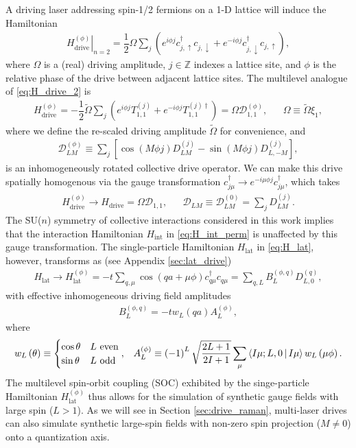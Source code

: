 \documentclass[nofootinbib,notitlepage,11pt]{revtex4-2}
\renewcommand{\t}{\text} %
\newcommand{\f}[2]{\dfrac{#1}{#2}} %
\newcommand{\p}[1]{\left(#1\right)} %
\renewcommand{\sp}[1]{\left[#1\right]} %
\newcommand{\bk}{\Braket} %
\newcommand{\1}{\mathds{1}}
\newcommand{\up}{\uparrow}
\newcommand{\dn}{\downarrow}
\newcommand{\D}{\mathcal{D}}
\begin{document}
A driving laser addressing spin-1/2 fermions on a 1-D lattice will
induce the Hamiltonian
\begin{align}
  \left. H_{\t{drive}}^{(\phi)} \right|_{n=2}
  = \f12 \Omega \sum_j
  \p{e^{i\phi j} c_{j,\up}^\dag c_{j,\dn}
    + e^{-i\phi j} c_{j,\dn}^\dag c_{j,\up}},
  \label{eq:H_drive_2}
\end{align}
where $\Omega$ is a (real) driving amplitude, $j\in\mathbb{Z}$ indexes
a lattice site, and $\phi$ is the relative phase of the drive between
adjacent lattice sites.  The multilevel analogue of
\eqref{eq:H_drive_2} is
\begin{align}
  H_{\t{drive}}^{(\phi)}
  = -\f12 \tilde\Omega \sum_j \p{e^{i\phi j} T_{1,1}^{(j)}
    + e^{-i\phi j} T_{1,1}^{(j)\dag}}
  = \Omega \D_{1,1}^{(\phi)},
  &&
  \Omega \equiv \tilde \Omega \xi_1,
  \label{eq:H_drive}
\end{align}
where we define the re-scaled driving amplitude $\tilde\Omega$ for
convenience, and
\begin{align}
  \D_{LM}^{(\phi)}
  \equiv \sum_j \sp{\cos\p{M\phi j} D_{LM}^{(j)}
    - \sin\p{M\phi j} D_{L,-M}^{(j)}},
  \label{eq:drive_rot}
\end{align}
is an inhomogeneously rotated collective drive operator.  We can make
this drive spatially homogenous via the gauge transformation
$c_{j\mu}^\dag \to e^{-i\mu\phi j} c_{j\mu}^\dag$, which takes
 \begin{align}
   H_{\t{drive}}^{(\phi)} \to H_{\t{drive}} = \Omega \D_{1,1},
   &&
   \D_{LM} \equiv \D_{LM}^{(0)} = \sum_j D_{LM}^{(j)}.
\end{align}
The SU($n$) symmetry of collective interactions considered in this
work implies that the interaction Hamiltonian $H_{\t{int}}$ in
\eqref{eq:H_int_perm} is unaffected by this gauge transformation.  The
single-particle Hamiltonian $H_{\t{lat}}$ in \eqref{eq:H_lat},
however, transforms as (see Appendix \ref{sec:lat_drive})
\begin{align}
  H_{\t{lat}}
  \to H_{\t{lat}}^{(\phi)}
  = -t \sum_{q,\mu} \cos\p{qa+\mu\phi} c_{q\mu}^\dag c_{q\mu}
  = \sum_{q,L} B_L^{(\phi,q)} D_{L,0}^{(q)},
  \label{eq:H_lat_SOC_B}
\end{align}
with effective inhomogeneous driving field amplitudes
\begin{align}
  B_L^{(\phi,q)} = -t w_L\p{qa} A_L^{(\phi)},
  \label{eq:B_L_phi}
\end{align}
where
\begin{align}
  w_L\p{\theta} \equiv
  \begin{cases}
    \cos\theta & L~\t{even} \\
    \sin\theta & L~\t{odd}
  \end{cases},
  &&
  A_L^{(\phi)} \equiv \p{-1}^L \sqrt{\f{2L+1}{2I+1}}
  \sum_\mu \bk{I\mu;L,0|I\mu} w_L\p{\mu\phi}.
  \label{eq:A_L_phi}
\end{align}
The multilevel spin-orbit coupling (SOC) exhibited by the
singe-particle Hamiltonian $H_{\t{lat}}^{(\phi)}$ thus allows for the
simulation of synthetic gauge fields with large spin ($L>1$).  As we
will see in Section \ref{sec:drive_raman}, multi-laser drives can also
simulate synthetic large-spin fields with non-zero spin projection
($M\ne0$) onto a quantization axis.
\end{document}
